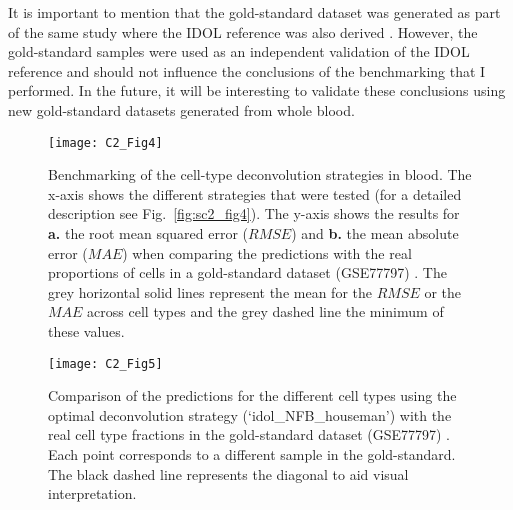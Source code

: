 \bigskip

It is important to mention that the gold-standard dataset was generated as part of the same study where the IDOL reference was also derived \citep{Koestler2016}. However, the gold-standard samples were used as an independent validation of the IDOL reference and should not influence the conclusions of the benchmarking that I performed. In the future, it will be interesting to validate these conclusions using new gold-standard datasets generated from whole blood.

\bigskip


\begin{figure}[htbp!] 
	\centering    
	\texttt{[image: C2\_Fig4]}
	\caption[Benchmarking of the cell-type deconvolution strategies in blood: $RMSE$ and $MAE$]{Benchmarking of the cell-type deconvolution strategies in blood. The x-axis shows the different strategies that were tested (for a detailed description see Fig.~\ref{fig:sc2_fig4}). The y-axis shows the results for \textbf{a.} the root mean squared error ($RMSE$) and \textbf{b.} the mean absolute error ($MAE$) when comparing the predictions with the real proportions of cells in a gold-standard dataset (GSE77797) \citep{Koestler2016}. The grey horizontal solid lines represent the mean for the $RMSE$ or the $MAE$ across cell types and the grey dashed line the minimum of these values.}
	\label{fig:c2_fig4}
\end{figure}

\begin{figure}[htbp!] 
	\centering    
	\texttt{[image: C2\_Fig5]}
	\caption[Predictions obtained for each blood cell type using the optimal deconvolution strategy]{Comparison of the predictions for the different cell types using the optimal deconvolution strategy (`idol\_NFB\_houseman') with the real cell type fractions in the gold-standard dataset (GSE77797) \citep{Koestler2016}. Each point corresponds to a different sample in the gold-standard. The black dashed line represents the diagonal to aid visual interpretation.}
	\label{fig:c2_fig5}
\end{figure}


